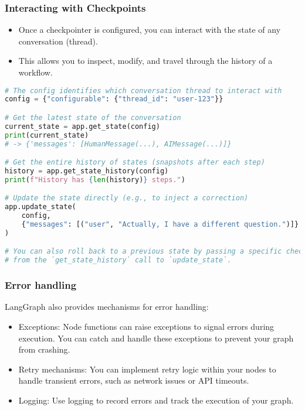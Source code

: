 \begin{frame}[fragile]\frametitle{Interacting with Checkpoints}
      \begin{itemize}
        \item Once a checkpointer is configured, you can interact with the state of any conversation (thread).
        \item This allows you to inspect, modify, and travel through the history of a workflow.
      \end{itemize}
\begin{lstlisting}[language=Python, basicstyle=\tiny]
# The config identifies which conversation thread to interact with
config = {"configurable": {"thread_id": "user-123"}}

# Get the latest state of the conversation
current_state = app.get_state(config)
print(current_state)
# -> {'messages': [HumanMessage(...), AIMessage(...)]}

# Get the entire history of states (snapshots after each step)
history = app.get_state_history(config)
print(f"History has {len(history)} steps.")

# Update the state directly (e.g., to inject a correction)
app.update_state(
    config,
    {"messages": [("user", "Actually, I have a different question.")]}
)

# You can also roll back to a previous state by passing a specific checkpoint
# from the `get_state_history` call to `update_state`.
\end{lstlisting}
\end{frame}

\begin{frame}[fragile]\frametitle{Error handling}
LangGraph also provides mechanisms for error handling:
      \begin{itemize}
        \item Exceptions: Node functions can raise exceptions to signal errors during execution. You can catch and handle these exceptions to prevent your graph from crashing.
        \item Retry mechanisms: You can implement retry logic within your nodes to handle transient errors, such as network issues or API timeouts.
        \item Logging: Use logging to record errors and track the execution of your graph.
      \end{itemize}
\end{frame}

